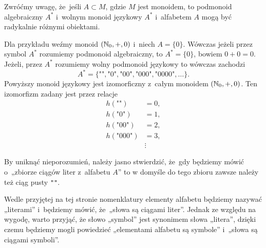 \documentclass[a4paper,11pt]{article}
\begin{document}
\vspace{\spaceFour}





 Zwróćmy uwagę, że~jeśli $A \subset M$, gdzie $M$ jest monoidem, to
podmonoid algebraiczny $A^{ * }$ i~wolnym monoid językowy $A^{ * }$
i~alfabetem $A$ mogą być radykalnie różnymi obiektami.

Dla przykładu weźmy monoid $( \mathbb{N}_{ 0 }, +, 0)$ i~niech $A = \{ 0 \}$. Wówczas
jeżeli przez symbol $A^{ * }$ rozumiemy podmonoid algebraiczny, to $A^{ * } =
\{ 0 \}$, bowiem $0 + 0 = 0$. Jeżeli, przez $A^{ * }$ rozumiemy wolny podmonoid
językowy to wówczas zachodzi
\begin{equation}
  \label{eq:Forys-Forys-09}
  A^{ * } = \{ \texttt{""}, \texttt{"} 0 \texttt{"},
  \texttt{"} 00 \texttt{"}, \texttt{"} 000 \texttt{"},
  \texttt{"} 0000 \texttt{"}, \ldots \}.
\end{equation}
Powyższy monoid językowy jest izomorficzny z~całym monoidem
$( \mathbb{N}_{ 0 }, +, 0)$. Ten izomorfizm zadany jest przez relacje
\begin{equation}
  \label{eq:Forys-Forys-10}
  \begin{split}
    h( \texttt{""} ) &= 0, \\
    h( \texttt{"} 0 \texttt{"} ) &= 1, \\
    h( \texttt{"} 0 0 \texttt{"} ) &= 2, \\
    h( \texttt{"} 0 0 0 \texttt{"} ) &= 3, \\
                     &\vdots
  \end{split}
\end{equation}

\vspace{\spaceFour}





\start {} By uniknąć nieporozumień, należy jasno stwierdzić, że~gdy
będziemy mówić o~„zbiorze ciągów liter z~alfabetu $A$” to w domyśle do tego
zbioru zawsze należy też ciąg pusty \texttt{""}.

\vspace{\spaceFour}





\start {} Wedle przyjętej na tej stronie nomenklatury elementy
alfabetu będziemy nazywać „literami” i~będziemy mówić, że~„słowa są
ciągami liter”. Jednak ze względu na wygodę, warto przyjąć, że słowo
„symbol” jest synonimem słowa „litera”, dzięki czemu będziemy mogli
powiedzieć „elementami alfabetu są symbole” i~„słowa są ciągami
symboli”.
\end{document}
